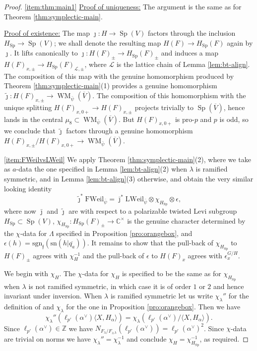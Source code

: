 \documentclass{article}
\def\mc#1{\mathcal{#1}}
\def\tx#1{\textrm{#1}}
\def\C{\mathbb{C}}
\def\Z{\mathbb{Z}}
\def\ol#1{\overline{#1}}
\def\<{\langle}
\def\>{\rangle}
\DeclareMathOperator{\Sp}{Sp}
\theoremstyle{definition}
\numberwithin{equation}{subsection}
\renewcommand{\-}{\hyp{}}
\DeclareMathOperator{\WM}{WM}
\newcommand{\rf}{\mathfrak{f}}
\newcommand{\oV}{\ol{V}}
\begin{document}
\begin{proof}
	\ref{item:thm:main1} \underline{Proof of uniqueness:} The argument is the same as for Theorem \ref{thm:symplectic-main}. 


	\underline{Proof of existence:} The map $\jmath : H \to \Sp(V)$ factors through the inclusion $H_{\Sp} \to \Sp(V)$; we shall denote the resulting map $H(F) \to H_{\Sp}(F)$ again by $\jmath$. It lifts canonically to $\jmath : H(F)_\pm \to H_{\Sp}(F)_\pm$ and induces a map $H(F)_{x,\pm} \to H_{\Sp}(F)_{\mc{L},\pm}$,
	where $\mc{L}$ is the lattice chain of Lemma \ref{lem:bt-align}. The composition of this map with the genuine homomorphism produced by Theorem \ref{thm:symplectic-main}(1) provides a genuine homomorphism $\tilde\jmath : H(F)_{x,\pm} \to \WM_{\bar\psi}(\oV)$. The composition of this homomorphism with the unique splitting $H(F)_{x,0+} \to H(F)_{x,\pm}$ projects trivially to $\Sp(\oV)$, hence lands in the central $\mu_8 \subset \WM_{\bar\psi}(\oV)$. But $H(F)_{x,0+}$ is pro-$p$ and $p$ is odd, so we conclude that $\tilde\jmath$ factors through a genuine homomorphism $H(F)_{x,\pm}/ H(F)_{x,0+} \to \WM_{\bar\psi}(\oV)$.

	\ref{item:FWeilvsLWeil} We apply Theorem \ref{thm:symplectic-main}(2), where we take as $a$-data the one specified in Lemma \ref{lem:bt-align}(2) when $\lambda$ is ramified symmetric, and in Lemma \ref{lem:bt-align}(3) otherwise, and obtain the very similar looking identity 
	\[ \tilde\jmath^*\mathrm{FWeil}_{\bar\psi} = \bar\jmath^*\mathrm{LWeil}_{\bar\psi} \otimes \chi_{H_{\Sp}} \otimes \epsilon,\] 
	where now $\bar\jmath$ and $\tilde\jmath$ are with respect to a polarizable twisted Levi subgroup $H_{\Sp} \subset \Sp(V)$, $\chi_{H_{\Sp}} : H_{\Sp}(F)_\pm \to \C^\times$ is the genuine character determined by the $\chi$-data for $\Lambda$ specified in Proposition \ref{pro:orangebox}, and $\epsilon(h)=\tx{sgn}_\rf(\tx{sn}(h|\ol{q_a}))$. It remains to show that the pull-back of $\chi_{H_{\Sp}}$ to $H(F)_\pm$ agrees with $\chi_H^{-1}$ and the pull-back of $\epsilon$ to $H(F)_x$ agrees with $\epsilon_x^{G/H}$.

	We begin with $\chi_H$. The $\chi$-data for $\chi_H$ is specified to be the same as for $\chi_{H_{\Sp}}$ when $\lambda$ is not ramified symmetric, in which case it is of order $1$ or $2$ and hence invariant under inversion. When $\lambda$ is ramified symmetric let us write $\chi_\lambda''$ for the definition of \cite[(4.2.5)]{FKS23} and $\chi_\lambda$ for the one in Proposition \ref{pro:orangebox}. Then we have
	\[ \chi_\lambda''(\ell_{p'}(\alpha^\vee)\<X,H_\alpha\>)=\chi_\lambda(\ell_{p'}(\alpha^\vee)/\<X,H_\alpha\>). \]
	Since $\ell_{p'}(\alpha^\vee) \in \Z$ we have $N_{F_\lambda/F_{\pm\lambda}}(\ell_{p'}(\alpha^\vee))=\ell_{p'}(\alpha^\vee)^2$. Since $\chi$-data are trivial on norms we have $\chi_\lambda''=\chi_\lambda^{-1}$ and conclude $\chi_H=\chi_{H_{\Sp}}^{-1}$, as required.
	


\end{proof}
\end{document}
